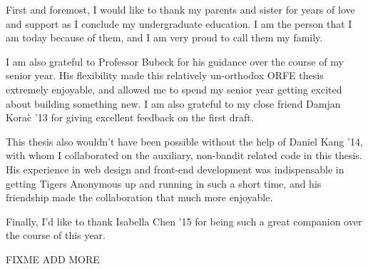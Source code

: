 First and foremost, I would like to thank my parents and sister for years of love and support as I conclude my undergraduate education. I am the person that I am today because of them, and I am very proud to call them my family.

I am also grateful to Professor Bubeck for his guidance over the course of my senior year. His flexibility made this relatively un-orthodox ORFE thesis extremely enjoyable, and allowed me to spend my senior year getting excited about building something new. I am also grateful to my close friend Damjan Kora\`{c} '13 for giving excellent feedback on the first draft.

This thesis also wouldn't have been possible without the help of Daniel Kang '14, with whom I collaborated on the auxiliary, non-bandit related code in this thesis. His experience in web design and front-end development was indispensable in getting Tigers Anonymous up and running in such a short time, and his friendship made the collaboration that much more enjoyable.

Finally, I'd like to thank Isabella Chen '15 for being such a great companion over the course of this year.

FIXME ADD MORE
